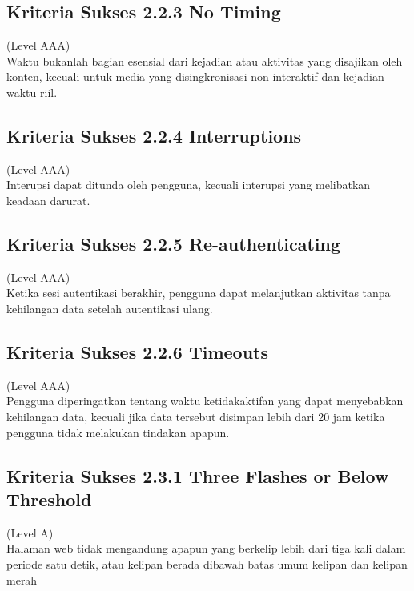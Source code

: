\subsection{Kriteria Sukses 2.2.3 No Timing}
\label{subsec:kriteria_2.2.3}
(Level AAA) \\

Waktu bukanlah bagian esensial dari kejadian atau aktivitas yang disajikan oleh konten, kecuali untuk media yang disingkronisasi non-interaktif dan kejadian waktu riil.

\subsection{Kriteria Sukses 2.2.4 Interruptions}
\label{subsec:kriteria_2.2.4}
(Level AAA) \\

Interupsi dapat ditunda oleh pengguna, kecuali interupsi yang melibatkan keadaan darurat.

\subsection{Kriteria Sukses 2.2.5 Re-authenticating}
\label{subsec:kriteria_2.2.5}
(Level AAA) \\

Ketika sesi autentikasi berakhir, pengguna dapat melanjutkan aktivitas tanpa kehilangan data setelah autentikasi ulang.

\subsection{Kriteria Sukses 2.2.6 Timeouts}
\label{subsec:kriteria_2.2.6}
(Level AAA) \\

Pengguna diperingatkan tentang waktu ketidakaktifan yang dapat menyebabkan kehilangan data, kecuali jika data tersebut disimpan lebih dari 20 jam ketika pengguna tidak melakukan tindakan apapun.

\subsection{Kriteria Sukses 2.3.1 Three Flashes or Below Threshold}
\label{subsec:kriteria_2.3.1}
(Level A) \\

Halaman web tidak mengandung apapun yang berkelip lebih dari tiga kali dalam periode satu detik, atau kelipan berada dibawah batas umum kelipan dan kelipan merah

